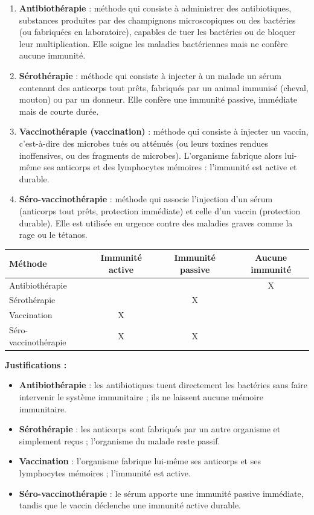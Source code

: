 \documentclass[11pt]{article}
\newcommand{\cle}[1]{{\popxbold\color{popdark}#1}}
\begin{document}
\begin{corrige}
\begin{enumerate}
\item \textbf{Antibiothérapie} : méthode qui consiste à administrer des \cle{antibiotiques}, substances produites par des champignons microscopiques ou des bactéries (ou fabriquées en laboratoire), capables de tuer les bactéries ou de bloquer leur multiplication. Elle soigne les maladies bactériennes mais ne confère aucune immunité.
\item \textbf{Sérothérapie} : méthode qui consiste à injecter à un malade un \cle{sérum} contenant des \cle{anticorps tout prêts}, fabriqués par un animal immunisé (cheval, mouton) ou par un donneur. Elle confère une immunité passive, immédiate mais de courte durée.
\item \textbf{Vaccinothérapie (vaccination)} : méthode qui consiste à injecter un \cle{vaccin}, c'est-à-dire des microbes tués ou atténués (ou leurs toxines rendues inoffensives, ou des fragments de microbes). L'organisme fabrique alors lui-même ses anticorps et des lymphocytes mémoires : l'immunité est active et durable.
\item \textbf{Séro-vaccinothérapie} : méthode qui associe l'injection d'un \cle{sérum} (anticorps tout prêts, protection immédiate) et celle d'un \cle{vaccin} (protection durable). Elle est utilisée en urgence contre des maladies graves comme la rage ou le tétanos.
\end{enumerate}
\end{corrige}

\begin{corrige}
\begin{center}
\begin{tabular}{|l|c|c|c|}
\hline
\rowcolor{popblueL} Méthode & Immunité active & Immunité passive & Aucune immunité \\
\hline
Antibiothérapie & & & X \\
\hline
Sérothérapie & & X & \\
\hline
Vaccination & X & & \\
\hline
Séro-vaccinothérapie & X & X & \\
\hline
\end{tabular}
\end{center}
\textbf{Justifications :}
\begin{itemize}
\item \textbf{Antibiothérapie} : les antibiotiques tuent directement les bactéries sans faire intervenir le système immunitaire ; ils ne laissent aucune mémoire immunitaire.
\item \textbf{Sérothérapie} : les anticorps sont fabriqués par un autre organisme et simplement reçus ; l'organisme du malade reste passif.
\item \textbf{Vaccination} : l'organisme fabrique lui-même ses anticorps et ses lymphocytes mémoires ; l'immunité est active.
\item \textbf{Séro-vaccinothérapie} : le sérum apporte une immunité passive immédiate, tandis que le vaccin déclenche une immunité active durable.
\end{itemize}
\end{corrige}
\end{document}
